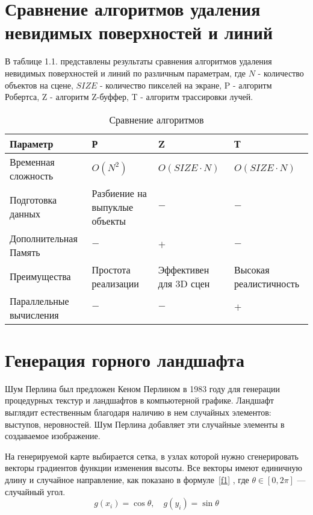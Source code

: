 \section{Сравнение алгоритмов удаления невидимых поверхностей и линий}
В таблице 1.1. представлены результаты сравнения алгоритмов удаления невидимых поверхностей и линий по различным параметрам, где 
$N$ - количество объектов на сцене, $SIZE$ - количество пикселей на экране, P - алгоритм Робертса, Z - алгоритм Z-буффер, T - алгоритм трассировки лучей. 

\begin{table}[h!]
        \small
        \captionsetup{justification=raggedright, singlelinecheck=false, labelsep=endash}
		\caption{Сравнение алгоритмов}
		
		\label{tbl:comparing_algorithms}
		\begin{tabular}{|p{3cm}|p{3cm}|p{3cm}|p{5cm}|}
			 \hline
             Параметр & Р & Z & Т \\
             \hline
             Временная сложность & $O(N^2)$ & $O(SIZE \cdot N)$ & $O(SIZE \cdot N)$ \\
             \hline
             Подготовка данных & Разбиение на выпуклые объекты & $-$ & $-$ \\
             \hline
             Дополнительная Память & $-$ & $+$ & $-$ \\
             \hline
             Преимущества & Простота реализации & Эффективен для 3D сцен & Высокая реалистичность \\
             \hline
             Параллельные вычисления & $-$ & $-$ & $+$ \\ 
             \hline
		\end{tabular}
\end{table}

\section{Генерация горного ландшафта}
Шум Перлина был предложен Кеном Перлином в 1983 году для генерации процедурных текстур и ландшафтов в компьютерной графике. Ландшафт выглядит естественным благодаря наличию в нем случайных элементов: выступов, неровностей. Шум Перлина добавляет эти случайные элементы в создаваемое изображение.

На генерируемой карте выбирается сетка, в узлах которой нужно сгенерировать векторы градиентов функции изменения высоты. Все векторы имеют единичную длину и случайное направление, как показано в формуле~\ref{f1} \cite{real_time}, где $\theta \in [0, 2\pi]$ — случайный угол.
\begin{equation}
g(x_i) = \cos{\theta} , \quad
g(y_i) = \sin{\theta}
\label{f1}
\end{equation}

